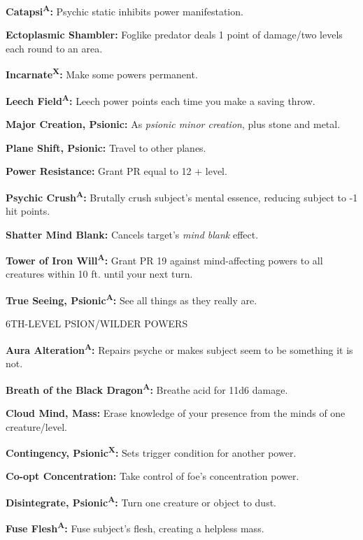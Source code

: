\documentclass{article}
\begin{document}
\textbf{Catapsi}\textsuperscript{\textbf{A}}\textbf{: }Psychic static inhibits 
power manifestation.

\textbf{Ectoplasmic Shambler: }Foglike predator deals 1 point of damage/two levels 
each round to an area.

\textbf{Incarnate}\textsuperscript{\textbf{X}}\textbf{: }Make some powers permanent.

\textbf{Leech Field}\textsuperscript{\textbf{A}}\textbf{: }Leech power points each 
time you make a saving throw.

\textbf{Major Creation, Psionic: }As \textit{psionic minor creation}, plus stone 
and metal.

\textbf{Plane Shift, Psionic: }Travel to other planes.

\textbf{Power Resistance: }Grant PR equal to 12 + level.

\textbf{Psychic Crush}\textsuperscript{\textbf{A}}\textbf{: }Brutally crush subject's 
mental essence, reducing subject to -1 hit points.

\textbf{Shatter Mind Blank: }Cancels target's \textit{mind blank }effect.

\textbf{Tower of Iron Will}\textsuperscript{\textbf{A}}\textbf{: }Grant PR 19 against 
mind-affecting powers to all creatures within 10 ft. until your next turn.

\textbf{True Seeing, Psionic}\textsuperscript{\textbf{A}}\textbf{: }See all things 
as they really are.

6TH-LEVEL PSION/WILDER POWERS

\textbf{Aura Alteration}\textsuperscript{\textbf{A}}\textbf{: }Repairs psyche or 
makes subject seem to be something it is not.

\textbf{Breath of the Black Dragon}\textsuperscript{\textbf{A}}\textbf{: }Breathe 
acid for 11d6 damage.

\textbf{Cloud Mind, Mass: }Erase knowledge of your presence from the minds of one 
creature/level.

\textbf{Contingency, Psionic}\textsuperscript{\textbf{X}}\textbf{: }Sets trigger 
condition for another power.

\textbf{Co-opt Concentration: }Take control of foe's concentration power.

\textbf{Disintegrate, Psionic}\textsuperscript{\textbf{A}}\textbf{: }Turn one creature 
or object to dust.

\textbf{Fuse Flesh}\textsuperscript{\textbf{A}}\textbf{: }Fuse subject's flesh, 
creating a helpless mass.
\end{document}
